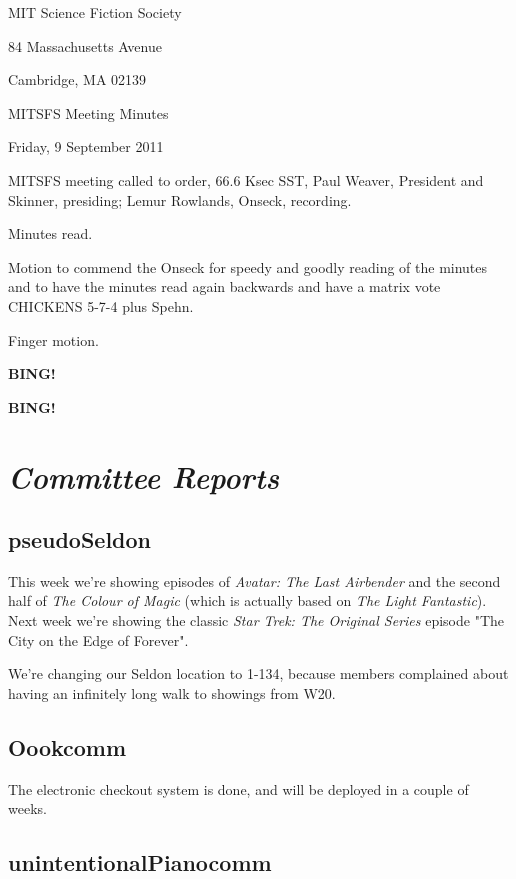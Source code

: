 \documentclass[10pt]{article}
\newcommand{\bing}{{\bf BING!} }
\newcommand{\goto}[1]{\bing \vskip 12pt \section*{{\em{#1}}}}
\newcommand{\ps}{ plus Spehn\xspace}
\newcommand{\skinner}{Paul Weaver, President and Skinner}
\newcommand{\onseck}{Lemur Rowlands, Onseck}
\newcommand{\meetingdate}{Friday, 9 September 2011}
\begin{document}
\begin{center}

MIT Science Fiction Society

84 Massachusetts Avenue

Cambridge, MA 02139

\vspace{12pt}

MITSFS Meeting Minutes

\meetingdate

\end{center}

\vspace{18pt}

\setlength{\parskip}{6pt}

\noindent
MITSFS meeting called to order, 66.6 Ksec SST,
\skinner, presiding; \onseck, recording.

Minutes read.

Motion to commend the Onseck for speedy and goodly reading of the minutes
and to have the minutes read again backwards and have a matrix vote
CHICKENS 5-7-4\ps.

Finger motion.

\bing

\goto{Committee Reports}

\subsection*{pseudoSeldon}

This week we're showing episodes of \emph{Avatar: The Last Airbender}
and the second half of \emph{The Colour of Magic} (which is actually
based on \emph{The Light Fantastic}).  Next week we're showing the
classic \emph{Star Trek: The Original Series} episode "The City on
the Edge of Forever".

We're changing our Seldon location to 1-134, because members
complained about having an infinitely long walk to showings from
W20.


\subsection*{Oookcomm}

The electronic checkout system is done, and will be deployed in a
couple of weeks.


\subsection*{unintentionalPianocomm}
\end{document}
